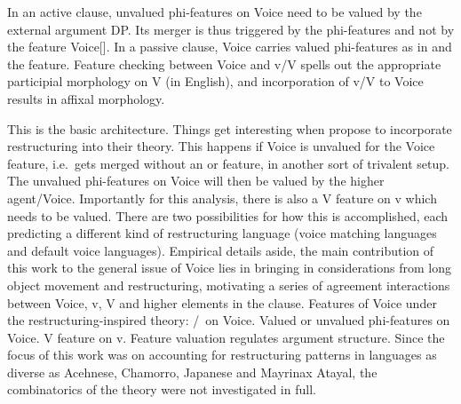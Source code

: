In an active clause, unvalued phi-features on Voice need to be valued by the external argument DP. Its merger is thus triggered by the phi-features and not by the feature Voice[]. In a passive clause, Voice carries valued phi-features as in \cite{legate14} and the  feature. Feature checking between Voice and v/V spells out the appropriate participial morphology on V (in English), and incorporation of v/V to Voice results in affixal morphology.

This is the basic architecture. Things get interesting when \cite{wurmbrandshimamura17} propose to incorporate restructuring into their theory. This happens if Voice is unvalued for the Voice feature, i.e.~gets merged without an  or  feature, in another sort of trivalent setup. The unvalued phi-features on Voice will then be valued by the higher agent/Voice. Importantly for this analysis, there is also a V feature on v which needs to be valued. There are two possibilities for how this is accomplished, each predicting a different kind of restructuring language (voice matching languages and default voice languages). Empirical details aside, the main contribution of this work to the general issue of Voice lies in bringing in considerations from long object movement and restructuring, motivating a series of agreement interactions between Voice, v, V and higher elements in the clause.
\pex Features of Voice under the restructuring-inspired theory:
	\a {}/\zero~on Voice.
	\a Valued or unvalued phi-features on Voice.
	\a V feature on v.
\xe
Feature valuation regulates argument structure. Since the focus of this work was on accounting for restructuring patterns in languages as diverse as Acehnese, Chamorro, Japanese and  Mayrinax Atayal, the combinatorics of the theory were not investigated in full.

